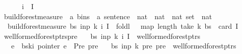 \begin{isabellebody}
\ \ \ \ \ \ i\ {\isasymin}\ I\isanewline
\ \ {\isacharbraceright}{\kern0pt}{\isachardoublequoteclose}\isanewline
\isanewline
{}\isamarkupfalse%
\ build{\isacharunderscore}{\kern0pt}forest{\isacharprime}{\kern0pt}{\isacharunderscore}{\kern0pt}measure\ {\isacharcolon}{\kern0pt}{\isacharcolon}{\kern0pt}\ {\isachardoublequoteopen}{\isacharparenleft}{\kern0pt}{\isacharprime}{\kern0pt}a\ bins\ {\isasymtimes}\ {\isacharprime}{\kern0pt}a\ sentence\ {\isasymtimes}\ nat\ {\isasymtimes}\ nat\ {\isasymtimes}\ nat\ set{\isacharparenright}{\kern0pt}\ {\isasymRightarrow}\ nat{\isachardoublequoteclose}\ \isanewline
\ \ {\isachardoublequoteopen}build{\isacharunderscore}{\kern0pt}forest{\isacharprime}{\kern0pt}{\isacharunderscore}{\kern0pt}measure\ {\isacharparenleft}{\kern0pt}bs{\isacharcomma}{\kern0pt}\ inp{\isacharcomma}{\kern0pt}\ k{\isacharcomma}{\kern0pt}\ i{\isacharcomma}{\kern0pt}\ I{\isacharparenright}{\kern0pt}\ {\isacharequal}{\kern0pt}\ foldl\ {\isacharparenleft}{\kern0pt}{\isacharplus}{\kern0pt}{\isacharparenright}{\kern0pt}\ {}\ {\isacharparenleft}{\kern0pt}map\ length\ {\isacharparenleft}{\kern0pt}take\ {\isacharparenleft}{\kern0pt}k{\isacharplus}{\kern0pt}{}{\isacharparenright}{\kern0pt}\ bs{\isacharparenright}{\kern0pt}{\isacharparenright}{\kern0pt}\ {\isacharminus}{\kern0pt}\ card\ I{\isachardoublequoteclose}\isanewline
\isanewline
{}\isamarkupfalse%
\ wellformed{\isacharunderscore}{\kern0pt}forest{\isacharunderscore}{\kern0pt}ptrs{\isacharunderscore}{\kern0pt}pre{\isacharcolon}{\kern0pt}\isanewline
\ \ \ {\isachardoublequoteopen}{\isacharparenleft}{\kern0pt}bs{\isacharcomma}{\kern0pt}\ inp{\isacharcomma}{\kern0pt}\ k{\isacharcomma}{\kern0pt}\ i{\isacharcomma}{\kern0pt}\ I{\isacharparenright}{\kern0pt}\ {\isasymin}\ wellformed{\isacharunderscore}{\kern0pt}forest{\isacharunderscore}{\kern0pt}ptrs{\isachardoublequoteclose}\isanewline
\ \ \ {\isachardoublequoteopen}e\ {\isacharequal}{\kern0pt}\ bs{\isacharbang}{\kern0pt}k{\isacharbang}{\kern0pt}i{\isachardoublequoteclose}\ {\isachardoublequoteopen}pointer\ e\ {\isacharequal}{\kern0pt}\ Pre\ pre{\isachardoublequoteclose}\isanewline
\ \ \ {\isachardoublequoteopen}{\isacharparenleft}{\kern0pt}bs{\isacharcomma}{\kern0pt}\ inp{\isacharcomma}{\kern0pt}\ {\isacharparenleft}{\kern0pt}k{\isacharminus}{\kern0pt}{}{\isacharparenright}{\kern0pt}{\isacharcomma}{\kern0pt}\ pre{\isacharcomma}{\kern0pt}\ {\isacharbraceleft}{\kern0pt}pre{\isacharbraceright}{\kern0pt}{\isacharparenright}{\kern0pt}\ {\isasymin}\ wellformed{\isacharunderscore}{\kern0pt}forest{\isacharunderscore}{\kern0pt}ptrs{\isachardoublequoteclose}%

\end{isabellebody}
